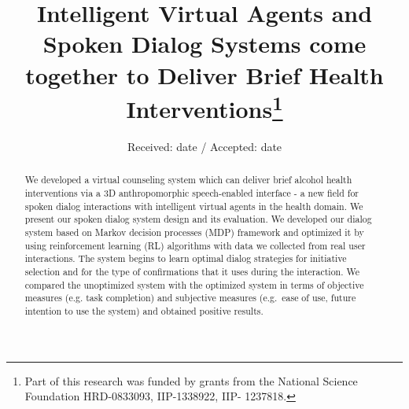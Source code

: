 \begin{sloppy}

\title{Intelligent Virtual Agents and Spoken Dialog Systems come together to Deliver Brief Health Interventions\thanks{Part of this research was funded by grants from the National Science Foundation HRD-0833093, IIP-1338922, IIP- 1237818.}
}


\author{        \and
}



\date{Received: date / Accepted: date}


\maketitle

\begin{abstract}
We developed a virtual counseling system which can deliver brief alcohol health interventions via a 3D anthropomorphic speech-enabled interface - a new field for spoken dialog interactions with intelligent virtual agents in the health domain. We present our spoken dialog system design and its evaluation. We developed our dialog system based on Markov decision processes (MDP) framework and optimized it by using reinforcement learning (RL) algorithms with data we collected from real user interactions. The system begins to learn optimal dialog strategies for initiative selection and for the type of confirmations that it uses during the interaction. We compared the unoptimized system with the optimized system in terms of objective measures (e.g. task completion) and subjective measures (e.g.~ease of use, future intention to use the system) and obtained positive results.

\end{abstract}


\end{sloppy}
